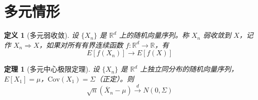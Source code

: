 \documentclass[12pt]{article}
\newtheorem{definition}{定义}
\newtheorem{theorem}{定理}
\begin{document}
\section{多元情形}

\begin{definition}[多元弱收敛]
设 $\{X_n\}$ 是 $\mathbb{R}^d$ 上的随机向量序列。称 $X_n$ 弱收敛到 $X$，记作 $X_n \Rightarrow X$，如果对所有有界连续函数 $f: \mathbb{R}^d \to \mathbb{R}$，有
$$E[f(X_n)] \to E[f(X)]$$
\end{definition}

\begin{theorem}[多元中心极限定理]
设 $\{X_n\}$ 是 $\mathbb{R}^d$ 上独立同分布的随机向量序列，$E[X_1] = \mu$，$\text{Cov}(X_1) = \Sigma$（正定）。则
$$\sqrt{n}(\overline{X}_n - \mu) \xrightarrow{d} N(0, \Sigma)$$
\end{theorem}
\end{document}
